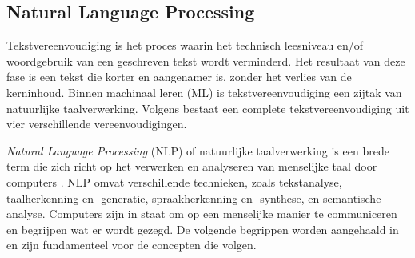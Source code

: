 

\subsection{Natural Language Processing}


Tekstvereenvoudiging is het proces waarin het technisch leesniveau en/of woordgebruik van een geschreven tekst wordt verminderd. Het resultaat van deze fase is een tekst die korter en aangenamer is, zonder het verlies van de kerninhoud. Binnen machinaal leren (ML) is tekstvereenvoudiging een zijtak van natuurlijke taalverwerking. \autocite{Siddharthan2006} Volgens \autocite{Siddharthan2014} bestaat een complete tekstvereenvoudiging uit vier verschillende vereenvoudigingen. %

\textit{Natural Language Processing} (NLP) of natuurlijke taalverwerking is een brede term die zich richt op het verwerken en analyseren van menselijke taal door computers \autocite{Eisenstein2019}. NLP omvat verschillende technieken, zoals tekstanalyse, taalherkenning en -generatie, spraakherkenning en -synthese, en semantische analyse. Computers zijn in staat om op een menselijke manier te communiceren en begrijpen wat er wordt gezegd. De volgende begrippen worden aangehaald in \textcite{Sohom2019, Eisenstein2019} en zijn fundamenteel voor de concepten die volgen.

